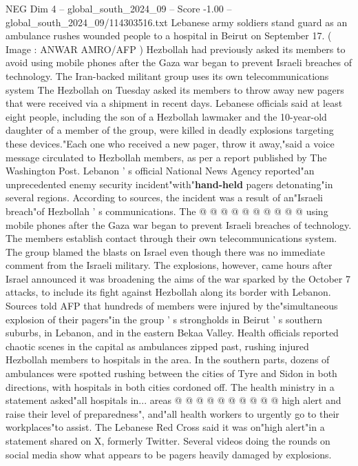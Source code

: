 \begin{textsample}{NEG Dim 4 – global\_south\_2024\_09 – Score -1.00 – global\_south\_2024\_09/114303516.txt}  \label{ex:f4_neg_165}
Lebanese army soldiers stand guard as an ambulance rushes wounded people to a hospital in Beirut on September 17. ( Image : ANWAR AMRO/AFP ) Hezbollah had previously asked its members to avoid using mobile phones after the Gaza war began to prevent Israeli breaches of technology.
The Iran-backed militant group uses its own telecommunications system The Hezbollah on Tuesday asked its members to throw away new pagers that were received via a shipment in recent days.
Lebanese officials said at least eight people, including the son of a Hezbollah lawmaker and the 10-year-old daughter of a member of the group, were killed in deadly explosions targeting these devices."Each one who received a new pager, throw it away,"said a voice message circulated to Hezbollah members, as per a report published by The Washington Post.
Lebanon ' s official National News Agency reported"an unprecedented enemy security incident"with"\textbf{hand-held} pagers detonating"in several regions.
According to sources, the incident was a result of an"Israeli breach"of Hezbollah ' s communications.
The @ @ @ @ @ @ @ @ @ @ using mobile phones after the Gaza war began to prevent Israeli breaches of technology.
The members establish contact through their own telecommunications system.
The group blamed the blasts on Israel even though there was no immediate comment from the Israeli military.
The explosions, however, came hours after Israel announced it was broadening the aims of the war sparked by the October 7 attacks, to include its fight against Hezbollah along its border with Lebanon.
Sources told AFP that hundreds of members were injured by the"simultaneous explosion of their pagers"in the group ' s strongholds in Beirut ' s southern suburbs, in Lebanon, and in the eastern Bekaa Valley.
Health officials reported chaotic scenes in the capital as ambulances zipped past, rushing injured Hezbollah members to hospitals in the area.
In the southern parts, dozens of ambulances were spotted rushing between the cities of Tyre and Sidon in both directions, with hospitals in both cities cordoned off.
The health ministry in a statement asked"all hospitals in... areas @ @ @ @ @ @ @ @ @ @ high alert and raise their level of preparedness", and"all health workers to urgently go to their workplaces"to assist.
The Lebanese Red Cross said it was on"high alert"in a statement shared on X, formerly Twitter.
Several videos doing the rounds on social media show what appears to be pagers heavily damaged by explosions.

\end{textsample}
